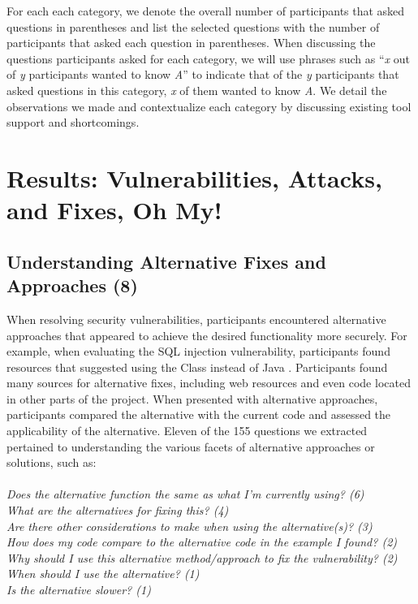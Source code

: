 \documentclass[conference]{IEEEtran}
\begin{document}
For each each category, we denote the overall number of participants that asked questions in parentheses and list the selected questions with the number of participants that asked each question in parentheses. 
When discussing the questions participants asked for each category, we will use phrases such as ``\emph{x} out of \emph{y} participants wanted to know \emph{A}'' to indicate that of the \emph{y} participants that asked questions in this category, \emph{x} of them wanted to know \emph{A}.
We detail the observations we made and contextualize each category by discussing existing tool support and shortcomings.

\section{Results: Vulnerabilities, Attacks, and Fixes, Oh My!}
\label{sec:results-vaf}



\noindent\subsection{\textbf{Understanding Alternative Fixes and Approaches (8)}}\label{uafa}

When resolving security vulnerabilities, participants encountered alternative approaches that appeared to achieve the desired functionality more securely.
For example, when evaluating the SQL injection vulnerability, participants found resources that suggested using the  Class instead of Java . 
Participants found many sources for alternative fixes, including web resources and even code located in other parts of the project.
When presented with alternative approaches, participants compared the alternative with the current code and assessed the applicability of the alternative. 
Eleven of the 155 questions we extracted pertained to understanding the various facets of alternative approaches or solutions, such as:
\\
\\
\noindent\emph{Does the alternative function the same as what I'm currently using? (6)} \\
\emph{What are the alternatives for fixing this? (4)} \\
\emph{Are there other considerations to make when using the alternative(s)? (3)} \\
\emph{How does my code compare to the alternative code in the example I found? (2)}
\emph{Why should I use this alternative method/approach to fix the vulnerability? (2)} \\
\emph{When should I use the alternative? (1)} \\
\emph{Is the alternative slower? (1)} \\
\end{document}
